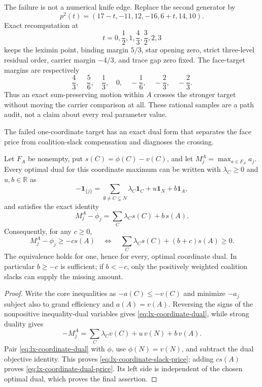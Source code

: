 The failure is not a numerical knife edge.  Replace the second generator by
\[
 p^2(t)=(17-t,-11,12,-16,6+t,14,10).
\]
Exact recomputation at
\[
 t=0,\frac12,1,\frac43,\frac32,2,3
\]
keeps the leximin point, binding margin $5/3$, star opening zero, strict
three-level residual order, carrier margin $-4/3$, and trace gap zero fixed.
The face-target margins are respectively
\[
 \frac43,\quad\frac56,\quad\frac13,\quad0,
 \quad-\frac16,\quad-\frac23,\quad-\frac23.
\]
Thus an exact sum-preserving motion within $A$ crosses the stronger target
without moving the carrier comparison at all.  These rational samples are a
path audit, not a claim about every real parameter value.

The failed one-coordinate target has an exact dual form that separates the
face price from coalition-slack compensation and diagnoses the crossing.

\begin{proposition}
\label{prop:lx-high-coordinate-dual}
Let $F_A$ be nonempty, put $s(C)=\phi(C)-v(C)$, and let
$M_j^A=\max_{a\in F_A}a_j$.  Every optimal dual for this coordinate maximum
can be written with $\lambda_C\geq0$ and $u,b\in\mathbb R$ as
\[
 -\mathbf1_{\{j\}}=
 \sum_{\emptyset\ne C\subsetneq N}\lambda_C\mathbf1_C
       +u\mathbf1_N+b\mathbf1_A,                    \tag{CD}
 \label{eq:lx-coordinate-dual}
\]
and satisfies the exact identity
\[
 M_j^A-\phi_j=\sum_C\lambda_Cs(C)+b\,s(A).          \tag{SP}
 \label{eq:lx-coordinate-slack-price}
\]
Consequently, for any $c\geq0$,
\[
 M_j^A-\phi_j\geq-cs(A)
 \quad\Longleftrightarrow\quad
 \sum_C\lambda_Cs(C)+(b+c)s(A)\geq0.               \tag{DP}
 \label{eq:lx-coordinate-dual-price}
\]
The equivalence holds for one, hence for every, optimal coordinate dual.  In
particular $b\geq-c$ is sufficient; if $b<-c$, only the positively weighted
coalition slacks can supply the missing amount.
\end{proposition}

\begin{proof}
Write the core inequalities as $-a(C)\leq-v(C)$ and minimize $-a_j$ subject
also to grand efficiency and $a(A)=v(A)$.  Reversing the signs of the
nonpositive inequality-dual variables gives \eqref{eq:lx-coordinate-dual},
while strong duality gives
\[
 -M_j^A=\sum_C\lambda_Cv(C)+u\,v(N)+b\,v(A).
\]
Pair \eqref{eq:lx-coordinate-dual} with $\phi$, use
$\phi(N)=v(N)$, and subtract the dual objective identity.  This proves
\eqref{eq:lx-coordinate-slack-price}; adding $cs(A)$ proves
\eqref{eq:lx-coordinate-dual-price}.  Its left side is independent of the
chosen optimal dual, which proves the final assertion.
\end{proof}

